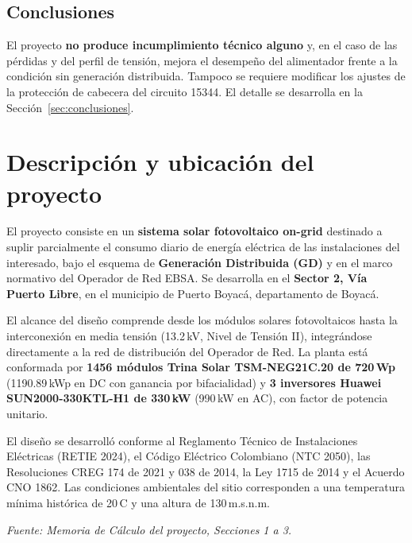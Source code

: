 \documentclass[11pt,a4paper]{article}
\begin{document}
\subsection*{Conclusiones}

El proyecto \textbf{no produce incumplimiento t\'ecnico alguno} y, en el caso de
las p\'erdidas y del perfil de tensi\'on, mejora el desempe\~no del alimentador
frente a la condici\'on sin generaci\'on distribuida. Tampoco se requiere
modificar los ajustes de la protecci\'on de cabecera del circuito 15344. El
detalle se desarrolla en la Secci\'on~\ref{sec:conclusiones}.

\section{Descripci\'on y ubicaci\'on del proyecto}
\label{sec:descripcion}
El proyecto consiste en un \textbf{sistema solar fotovoltaico on-grid} destinado
a suplir parcialmente el consumo diario de energ\'ia el\'ectrica de las
instalaciones del interesado, bajo el esquema de \textbf{Generaci\'on Distribuida
(GD)} y en el marco normativo del Operador de Red EBSA. Se desarrolla en el
\textbf{Sector 2, V\'ia Puerto Libre}, en el municipio de Puerto Boyac\'a,
departamento de Boyac\'a.

El alcance del dise\~no comprende desde los m\'odulos solares fotovoltaicos hasta
la interconexi\'on en media tensi\'on (13.2\,kV, Nivel de Tensi\'on II),
integr\'andose directamente a la red de distribuci\'on del Operador de Red. La
planta est\'a conformada por \textbf{1456 m\'odulos Trina Solar TSM-NEG21C.20 de
720\,Wp} (1190.89\,kWp en DC con ganancia por bifacialidad) y \textbf{3
inversores Huawei SUN2000-330KTL-H1 de 330\,kW} (990\,kW en AC), con factor de
potencia unitario.

El dise\~no se desarroll\'o conforme al Reglamento T\'ecnico de Instalaciones
El\'ectricas (RETIE 2024), el C\'odigo El\'ectrico Colombiano (NTC 2050), las
Resoluciones CREG 174 de 2021 y 038 de 2014, la Ley 1715 de 2014 y el Acuerdo
CNO 1862. Las condiciones ambientales del sitio corresponden a una temperatura
m\'inima hist\'orica de 20\,\textdegree{}C y una altura de 130\,m.s.n.m.

\emph{Fuente: Memoria de C\'alculo del proyecto, Secciones 1 a 3.}
\end{document}
